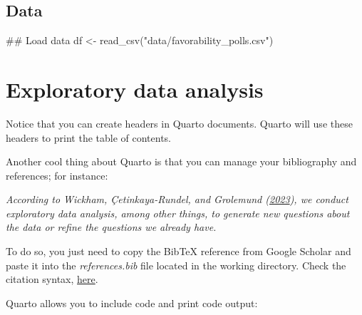 \documentclass[
  12pt,
  letterpaper,
  DIV=11,
  numbers=noendperiod]{scrartcl}
\newenvironment{Shaded}{}{}
\newcommand{\DocumentationTok}[1]{\textcolor[rgb]{0.89,0.34,0.29}{#1}}
\newcommand{\FunctionTok}[1]{\textcolor[rgb]{0.25,0.47,0.95}{#1}}
\newcommand{\NormalTok}[1]{\textcolor[rgb]{0.22,0.23,0.26}{#1}}
\newcommand{\OtherTok}[1]{\textcolor[rgb]{0.15,0.68,0.38}{#1}}
\newcommand{\StringTok}[1]{\textcolor[rgb]{0.31,0.63,0.31}{#1}}
\begin{document}
\hypertarget{data}{%
\subsection{Data}\label{data}}

\begin{Shaded}
\begin{Highlighting}[]
\DocumentationTok{\#\# Load data}
\NormalTok{df }\OtherTok{\textless{}{-}} \FunctionTok{read\_csv}\NormalTok{(}\StringTok{"data/favorability\_polls.csv"}\NormalTok{)}
\end{Highlighting}
\end{Shaded}

\hypertarget{exploratory-data-analysis}{%
\section{Exploratory data analysis}\label{exploratory-data-analysis}}

Notice that you can create headers in Quarto documents. Quarto will use
these headers to print the table of contents.

Another cool thing about Quarto is that you can manage your bibliography
and references; for instance:

\emph{According to Wickham, Çetinkaya-Rundel, and Grolemund
(\protect\hyperlink{ref-wickham2023r}{2023}), we conduct exploratory
data analysis, among other things, to generate new questions about the
data or refine the questions we already have.}

To do so, you just need to copy the BibTeX reference from Google Scholar
and paste it into the \emph{references.bib} file located in the working
directory. Check the citation syntax,
\href{https://quarto.org/docs/authoring/citations.html}{here}.

Quarto allows you to include code and print code output:
\end{document}
